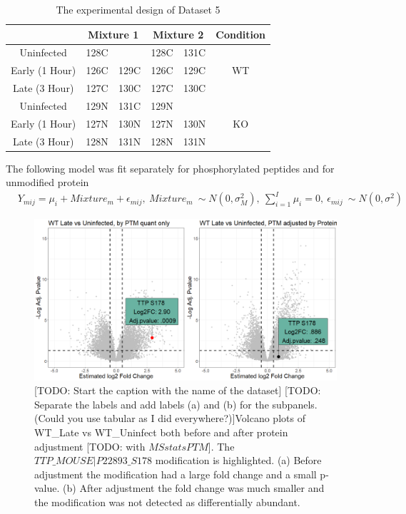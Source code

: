 \documentclass{mcp}
\def\todo#1{{\color{red}[TODO: #1]}}
\begin{document}
\begin{table}[h!]
\centering
\begin{tabular}{|c | c c | c c | c|}
\hline
 & \multicolumn{2}{c}{Mixture 1} & \multicolumn{2}{c}{Mixture 2} & Condition \\ [0.5ex]
 \hline\hline
 Uninfected & 128C & & 128C & 131C & \\
 \hline
Early (1 Hour) & 126C & 129C & 126C & 129C & WT \\
\hline
Late (3 Hour) & 127C & 130C & 127C & 130C & \\
\hline
Uninfected & 129N & 131C & 129N & & \\
\hline
Early (1 Hour) & 127N & 130N & 127N & 130N & KO \\
\hline
Late (3 Hour) & 128N & 131N & 128N & 131N & \\
\hline
\end{tabular}
\caption{The experimental design of Dataset 5}
\label{table:shigella_design}
\end{table}
The following model was fit separately for phosphorylated peptides and for unmodified protein 
\begin{eqnarray*}
& Y_{mij} = \mu_i + Mixture_m + \epsilon_{mij},\ Mixture_m ~ \sim N(0, \sigma^2_M) ,\  \sum_{i=1}^I{\mu_i} = 0 ,\ \epsilon_{mij} ~ \sim N(0, \sigma^2)&
\end{eqnarray*}

\begin{figure}[h!]
\centering
	\includegraphics[width=.8\textwidth]{sim_new/No_Difference_Shigella_Volcano}
	\caption{\todo{Start the caption with the name of the dataset} \todo{Separate the labels and add labels (a) and (b) for the subpanels.  (Could you use tabular as I did everywhere?)}Volcano plots of WT\_Late vs WT\_Uninfect both before and after protein adjustment \todo{with $MSstatsPTM$}. The $TTP\_MOUSE|P22893\_S178$ modification is highlighted. (a) Before adjustment the modification had a large fold change and a small p-value. (b) After adjustment the fold change was much smaller and the modification was not detected as differentially abundant.}
\label{fig:No_Diff_Shigella_PTM}
\end{figure}
\end{document}
